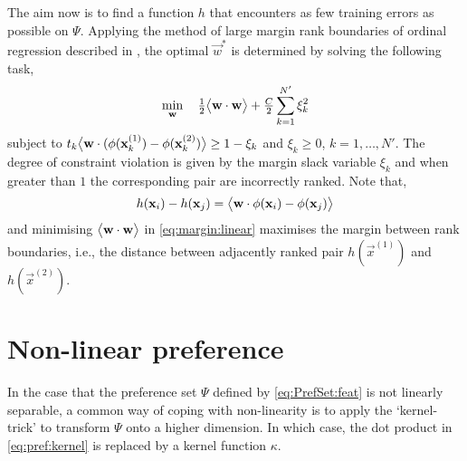 The aim now is to find a function $h$ that encounters as few training errors as 
possible on $\Psi$. Applying the method of large margin rank boundaries of 
ordinal regression described in \cite{Herbrich00}, the optimal $\vec{w}^*$ is 
determined by solving the following task, 
\begin{equation}\label{eq:margin:linear}
	\min_{\vec{w}}\quad \tfrac{1}{2}\inner{\vec{w}}{\vec{w}} + \tfrac{C}{2}\sum_{k=1}^{N'}\xi_k^2
\end{equation}
subject to $t_k\big<{\mathbf{w}}\cdot{({\mathbf{\phi}}(\mathbf{x}_k^{(1)})-{\mathbf{\phi}}(\mathbf{x}_k^{(2)})}\big>\ge 1 - \xi_k$ and $\xi_k \ge 0$, $k = 1,\ldots, N'$. The degree of constraint violation is given by the margin slack variable $\xi_k$ and when greater than $1$ the corresponding pair are incorrectly ranked. 
Note that,
\begin{equation}
	h(\mathbf{x}_i)-h(\mathbf{x}_j)=\big<{\mathbf{w}}\cdot{{\mathbf{\phi}}(\mathbf{x}_i)-{\mathbf{\phi}}(\mathbf{x}_j)}\big>
\end{equation}
and minimising $\big<{\mathbf{w}}\cdot{\mathbf{w}}\big>$ in \cref{eq:margin:linear} maximises 
the margin between rank boundaries, i.e., the distance between adjacently 
ranked pair $h(\vec{x}^{(1)})$ and $h(\vec{x}^{(2)})$.


\section{Non-linear preference}\label{sec:ord:nonlinpref}
In the case that the preference set $\Psi$ defined by \cref{eq:PrefSet:feat} is 
not linearly separable, a common way of coping with non-linearity is to apply 
the `kernel-trick' to transform $\Psi$ onto a higher dimension. In which case, 
the dot product in \cref{eq:pref:kernel} is replaced by a kernel function 
$\kappa$.

